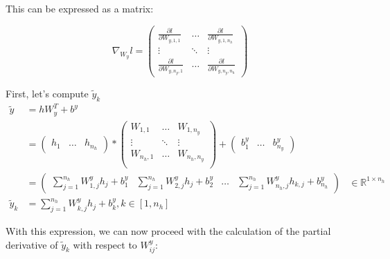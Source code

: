 \documentclass{article}
\theoremstyle{plain}%
\theoremstyle{definition}
\theoremstyle{remark}
\begin{document}
This can be expressed as a matrix:

\[
    \nabla_{W_y} l = \begin{pmatrix}
        \frac{\partial l}{\partial W_{y, 1,1}}   & \dots  & \frac{\partial l}{\partial W_{y, 1,n_h}}    \\
        \vdots                                   & \ddots & \vdots                                      \\
        \frac{\partial l}{\partial W_{y, n_y,1}} & \dots  & \frac{\partial l}{\partial W_{y, n_y, n_h}}
    \end{pmatrix}
\]

First, let's compute $ \tilde{y}_k $
\begin{align*}
    \tilde{y}   & = h W_y^T + b^y                                                                                                                                  \\
                & = \begin{pmatrix}
                        h_{1} & \dots & h_{n_h}
                    \end{pmatrix} * \begin{pmatrix}
                                        W_{1, 1}   & \dots  & W_{1, n_y}   \\
                                        \vdots     & \ddots & \vdots       \\
                                        W_{n_h, 1} & \dots  & W_{n_h, n_y} \\
                                    \end{pmatrix} + \begin{pmatrix}
                                                        b^y_1 & \dots & b^y_{n_y}
                                                    \end{pmatrix}                                                                                      \\
                & = \begin{pmatrix}
                        \sum_{j=1}^{n_h} W^y_{1,j} h_{j} + b^y_1 & \sum_{j=1}^{n_h} W^y_{2,j} h_{j} + b^y_2 & \dots & \sum_{j=1}^{n_h} W^y_{n_h,j} h_{k,j} + b^y_{n_h}
                    \end{pmatrix} & \in \mathbb{R}^{1 \times n_h} \\
    \tilde{y}_k & = \sum_{j=1}^{n_h} W^y_{k,j} h_{j} + b_k^y, k \in [1, n_h]
\end{align*}

With this expression, we can now proceed with the calculation of the partial derivative of \( \tilde{y}_k \) with respect to \( W^y_{ij} \):
\end{document}
